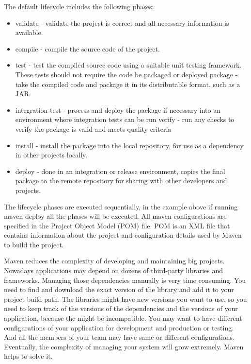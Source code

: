   The default lifecycle includes the following phases:
  \begin{itemize}
    \item validate - validate the project is correct and all necessary
    information is available.
    \item compile - compile the source code of the project.
    \item test - test the compiled source code using a suitable unit testing
    framework. These tests should not require the code be packaged or deployed
    package - take the compiled code and package it in its distributable format,
    such as a JAR.
    \item integration-test - process and deploy the package if necessary into an
    environment where integration tests can be run verify - run any checks to
    verify the package is valid and meets quality criteria
    \item install - install the package into the local repository, for use as a
      dependency in other projects locally.
    \item  deploy - done in an integration or
    release environment, copies the final package to the remote repository for
    sharing with other developers and projects.
  \end{itemize}
  
  The lifecycle phases are executed sequentially, in the example above if running maven deploy 
  all the phases will be executed. All maven configurations are specified in the Project Object Model (POM) file.
  POM is an XML file that contains information about the project and configuration details used by Maven 
  to build the project. 

  Maven reduces the complexity of developing and maintaining big projects.
  Nowadays applications may depend on dozens of third-party libraries and
  frameworks. Managing those dependencies manually is very time consuming. You
  need to find and download the exact version of the library and add it to your project build path.
  The libraries might have new versions you want to use, so you need to keep track of the versions
  of the dependencies and the versions of your application, because the might be incompatible. 
  You may want to have different configurations of your application for development and production or testing.
  And all the members of your team may have same or different configurations.
  Eventually, the complexity of managing your system will grow extremely. Maven helps to solve it.

